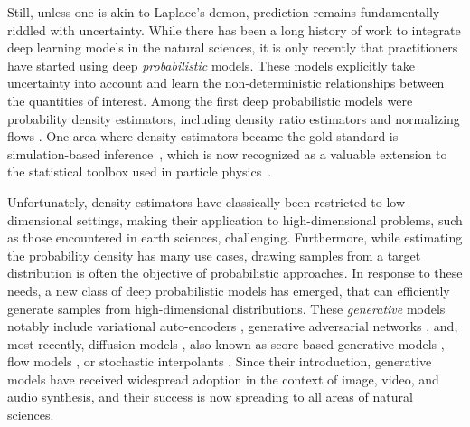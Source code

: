 Still, unless one is akin to Laplace's demon, prediction remains fundamentally riddled with uncertainty. While there has been a long history of work to integrate deep learning models in the natural sciences, it is only recently that practitioners have started using deep \emph{probabilistic} models. These models explicitly take uncertainty into account and learn the non-deterministic relationships between the quantities of interest. Among the first deep probabilistic models were probability density estimators, including density ratio estimators \cite{tu2007learning, sugiyama2012density, gutmann2012noisecontrastive, cranmer2016approximating, cranmer2016experiments, menon2016linking, stoye2018likelihoodfree, belghazi2018mutual, durkan2020contrastive, rhodes2020telescoping, brehmer2020mining, hermans2020likelihoodfree, miller2021truncated, rozet2021arbitrary, miller2022contrastive, delaunoy2022reliable, choi2022density} and normalizing flows \cite{tabak2013family, dinh2014nice, rezende2015variational, dinh2016density, papamakarios2017masked, huang2018neural, wehenkel2019unconstrained, durkan2019neural, papamakarios2021normalizing}. One area where density estimators became the gold standard is simulation-based inference~\cite{cranmer2020frontier}, which is now recognized as a valuable extension to the statistical toolbox used in particle physics~\cite{atlascollaboration2025implementation}.

Unfortunately, density estimators have classically been restricted to low-dimensional settings, making their application to high-dimensional problems, such as those encountered in earth sciences, challenging. Furthermore, while estimating the probability density has many use cases, drawing samples from a target distribution is often the objective of probabilistic approaches. In response to these needs, a new class of deep probabilistic models has emerged, that can efficiently generate samples from high-dimensional distributions. These \emph{generative} models notably include variational auto-encoders \cite{kingma2013autoencoding, kingma2019introduction}, generative adversarial networks \cite{goodfellow2014generative}, and, most recently, diffusion models \cite{sohl-dickstein2015deep, ho2020denoising}, also known as score-based generative models \cite{song2019generative, song2021scorebased}, flow models \cite{liu2023flow, lipman2023flow}, or stochastic interpolants \cite{albergo2023stochastic}. Since their introduction, generative models have received widespread adoption in the context of image, video, and audio synthesis, and their success is now spreading to all areas of natural sciences.

